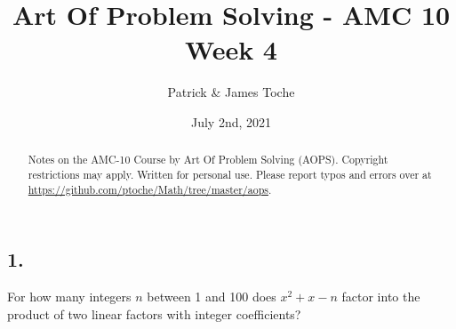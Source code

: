 \documentclass[12pt]{article}
\title{Art Of Problem Solving - AMC 10 \\ Week 4}
\author{Patrick \& James Toche}
\date{July 2nd, 2021}
\begin{document}
\maketitle
\begin{minipage}{\textwidth}
\begin{abstract}\setlength{\parindent}{0pt}%
Notes on the AMC-10 Course by Art Of Problem Solving (AOPS).
Copyright restrictions may apply. Written for personal use. 
Please report typos and errors over at \url{https://github.com/ptoche/Math/tree/master/aops}. 
\end{abstract}
\end{minipage}

\thispagestyle{empty}
\clearpage


\subsection*{1.}

\nopagebreak

For how many integers $n$ between 1 and 100 does $x^2 + x - n$ factor into the product of two linear factors with integer coefficients?

\nopagebreak

\end{document}
